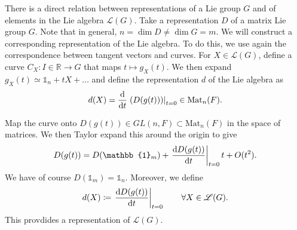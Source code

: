\begin{claim}
  There is a direct relation between representations of a Lie group $G$ and of elements in the Lie algebra $\mathscr{L}(G)$.
  Take a representation $D$ of a matrix Lie group $G$. Note that in general, $n = \dim D \neq \dim G = m$. We will construct a corresponding representation of the Lie algebra.
  To do this, we use again the correspondence between tangent vectors and curves.
  For $X \in \mathscr{L}(G)$, define a curve $C_X \colon I \in \mathbb{R} \to G$ that maps $t \mapsto g_X(t)$. We then expand $g_X(t) \simeq \mathbb{1}_n + t X + \dots$ and define the representation $d$ of the Lie algebra as
  \begin{equation}
    d(X) = \dv{}{t} \left. \left( D(g(t)) \right) \right\rvert_{t=0} \in \text{Mat}_n(F).
  \end{equation}

  Map the curve onto $D(g(t)) \in GL(n, F) \subset \text{Mat}_n(F)$ in the space of matrices.
  We then Taylor expand this around the origin to give
  \begin{equation}
    D(g(t)) = D(\mathbb{1}_m) + \left.\dv{D(g(t))}{t}\right\rvert_{t = 0} t + O(t^2).
  \end{equation}
  We have of course $D(\mathbb{1}_m) = \mathbb{1}_n$. Moreover, we define 
  \begin{equation}
    d(X) \coloneqq \left.\dv{D(g(t))}{t}\right\rvert_{t=0} \qquad \forall X \in \mathscr{L}(G).
  \end{equation}
  This provdides a representation of $\mathscr{L}(G)$.
\end{claim}


